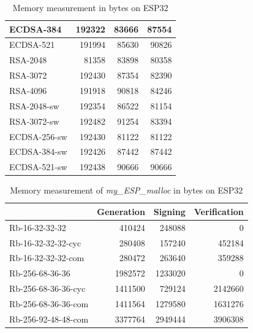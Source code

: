 \documentclass[thesis=M,english]{FITthesis}[2019/12/23]
\begin{document}
\begin{table}[]
\begin{tabular}{|l|r|r|r|}
 ECDSA-384 &  192322   &  83666 &  87554      \\ \hline
 ECDSA-521 &  191994   &  85630 &  90826      \\ \hline
 RSA-2048  &  81358    &  83898 &  80358      \\ \hline
 RSA-3072  &  192430   &  87354 &  82390      \\ \hline
 RSA-4096  &  191918   &  90818 &  84246      \\ \hline
 RSA-2048-sw  & 192354 & 86522 & 81154 \\ \hline
RSA-3072-sw  & 192482 & 91254 & 83394 \\ \hline
ECDSA-256-sw & 192430 & 81122 & 81122 \\ \hline
ECDSA-384-sw & 192426 & 87442 & 87442 \\ \hline
ECDSA-521-sw & 192438 & 90666 & 90666 \\ \hline
\end{tabular}
\caption{Memory measurement in bytes on ESP32}
\end{table}

\begin{table}[]
\centering
\begin{tabular}{|l|r|r|r|}
\hline
                    & \multicolumn{1}{l|}{Generation} & \multicolumn{1}{l|}{Signing} & \multicolumn{1}{l|}{Verification} \\ \hline
Rb-16-32-32-32      & 410424                          & 248088                       & 0                                 \\ \hline
Rb-16-32-32-32-cyc  & 280408                          & 157240                       & 452184                            \\ \hline
Rb-16-32-32-32-com  & 280472                          & 263640                       & 359288                            \\ \hline
Rb-256-68-36-36     & 1982572                         & 1233020                      & 0                                 \\ \hline
Rb-256-68-36-36-cyc & 1411500                         & 729124                       & 2142660                           \\ \hline
Rb-256-68-36-36-com & 1411564                         & 1279580                      & 1631276                           \\ \hline
Rb-256-92-48-48-com & 3377764                         & 2949444                      & 3906308                           \\ \hline
\end{tabular}
\caption{Memory measurement of \textit{my\_ESP\_malloc} in bytes on ESP32}
\end{table}
\end{document}
